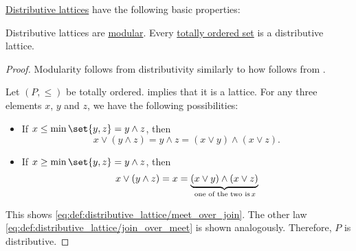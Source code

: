 \begin{proposition}\label{thm:def:distributive_lattice}
  \hyperref[def:distributive_lattice]{Distributive lattices} have the following basic properties:
  \begin{thmenum}
     Distributive lattices are \hyperref[def:modular_lattice]{modular}.
     Every \hyperref[def:totally_ordered_set]{totally ordered set} is a distributive lattice.
  \end{thmenum}
\end{proposition}
\begin{proof}
   Modularity follows from distributivity similarly to how  follows from .

   Let \( (P, \leq) \) be totally ordered.  implies that it is a lattice. For any three elements \( x \), \( y \) and \( z \), we have the following possibilities:
  \begin{itemize}
    \item If \( x \leq \min\set{ y, z } = y \wedge z \), then
    \begin{equation*}
      x \vee (y \wedge z) = y \wedge z = (x \vee y) \wedge (x \vee z).
    \end{equation*}

    \item If \( x \geq \min\set{ y, z } = y \wedge z \), then
    \begin{equation*}
      x \vee (y \wedge z) = x = \underbrace{(x \vee y) \wedge (x \vee z)}_{\T*{one of the two is} x}
    \end{equation*}
  \end{itemize}

  This shows \eqref{eq:def:distributive_lattice/meet_over_join}. The other law \eqref{eq:def:distributive_lattice/join_over_meet} is shown analogously. Therefore, \( P \) is distributive.
\end{proof}

